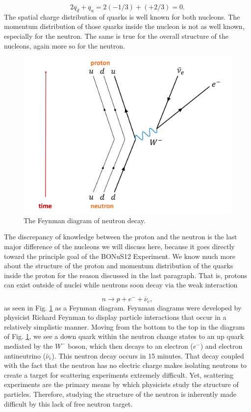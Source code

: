 \begin{equation}
2q_d + q_u = 2(-1/3) + (+2/3) = 0.
\end{equation}
The spatial charge distribution of quarks is well known for both nucleons. The momentum distribution of those quarks inside the nucleon is not as well known, especially for the neutron. The same is true for the overall structure of the nucleons, again more so for the neutron.

\begin{figure}[h!]
	\centering
	\includegraphics[width=0.6\linewidth]{figures/neutron_decay.png}
	\caption{The Feynman diagram of neutron decay.}
	\label{fig:neutron_decay}
\end{figure}

The discrepancy of knowledge between the proton and the neutron is the last major difference of the nucleons we will discuss here, because it goes directly toward the principle goal of the BONuS12 Experiment. We know much more about the structure of the proton and momentum distribution of the quarks inside the proton for the reason discussed in the last paragraph. That is, protons can exist outside of nuclei while neutrons soon decay via the weak interaction

\begin{equation}
n \longrightarrow p + e^{-} + \bar{\nu}_{e},
\end{equation}
as seen in Fig. \ref{fig:neutron_decay} as a Feynman diagram. Feynman diagrams were developed by physicist Richard Feynman to display particle interactions that occur in a relatively simplistic manner. Moving from the bottom to the top in the diagram of Fig. \ref{fig:neutron_decay}, we see a down quark within the neutron change states to an up quark mediated by the $W^-$ boson, which then decays to an electron ($e^-$) and electron antineutrino ($\bar{\nu}_{e}$). This neutron decay occurs in 15 minutes. That decay coupled with the fact that the neutron has no electric charge makes isolating neutrons to create a target for scattering experiments extremely difficult. Yet, scattering experiments are the primary means by which physicists study the structure of particles. Therefore, studying the structure of the neutron is inherently made difficult by this lack of free neutron target.


